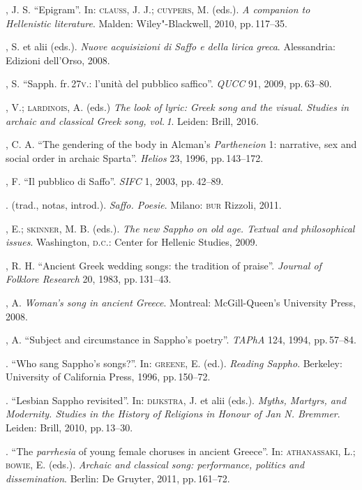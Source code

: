 \begin{bibliohedra}
, J. S. “Epigram”. In: \textsc{clauss}, J. J.; \textsc{cuypers}, M. (eds.). \emph{A companion to Hellenistic literature}. Malden: Wiley"-Blackwell, 2010, pp.\,117--35. 

, S. et alii (eds.). \emph{Nuove acquisizioni di Saffo e della lirica greca}. Alessandria: Edizioni dell'Orso, 2008.

, S. “Sapph. fr.\,27\textsc{v}.: l’unità del pubblico saffico”. \emph{QUCC} 91, 2009, pp.\,63--80.

, V.; \textsc{lardinois}, A. (eds.) \emph{The look of lyric: Greek song and the visual. Studies in archaic and classical Greek song, vol.\,1}. Leiden: Brill, 2016.

, C. A. “The gendering of the body in Alcman’s \emph{Partheneion} 1: narrative, sex and social order in archaic Sparta”. \emph{Helios} 23, 1996, pp.\,143--172.

, F. “Il pubblico di Saffo”. \emph{SIFC} 1, 2003, pp.\,42--89.

\titidem. (trad., notas, introd.). \emph{Saffo. Poesie}. Milano: \textsc{bur} Rizzoli, 2011.

, E.; \textsc{skinner}, M. B. (eds.). \emph{The new Sappho on old age. Textual and philosophical issues}. Washington, \textsc{d.c.}: Center for Hellenic Studies, 2009.

, R. H. “Ancient Greek wedding songs: the tradition of praise”. \emph{Journal of Folklore Research} 20, 1983, pp.\,131--43.

, A. \emph{Woman’s song in ancient Greece}. Montreal: McGill-Queen’s University Press, 2008. 

, A. “Subject and circumstance in Sappho’s poetry”. \emph{TAPhA} 124, 1994, pp.\,57--84.

\titidem. “Who sang Sappho’s songs?”. In: \textsc{greene}, E. (ed.). \emph{Reading Sappho}. Berkeley: University of California Press, 1996, pp.\,150--72.

\titidem. ``Lesbian Sappho revisited''. In: \textsc{dijkstra}, J. et alii (eds.). \emph{Myths, Martyrs, and Modernity. Studies in the History of Religions in Honour of Jan N. Bremmer}. Leiden: Brill, 2010, pp.\,13--30.

\titidem. “The \emph{parrhesia} of young female choruses in ancient Greece”. In: \textsc{athanassaki}, L.; \textsc{bowie}, E. (eds.). \emph{Archaic and classical song: performance, politics and dissemination}. Berlin: De Gruyter, 2011, pp.\,161--72. 


\end{bibliohedra}
